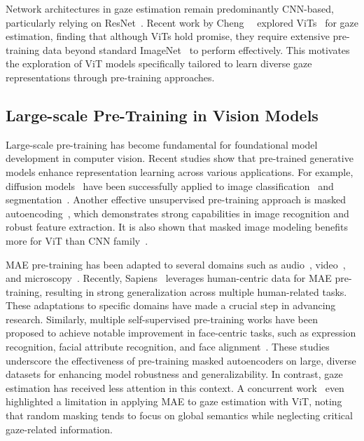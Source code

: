 Network architectures in gaze estimation remain predominantly CNN-based, particularly relying on ResNet~\cite{he2016deep}.
Recent work by Cheng~\etal~\cite{cheng2022gaze} explored ViTs~\cite{dosovitskiy2020vit} for gaze estimation, finding that although ViTs hold promise, they require extensive pre-training data beyond standard ImageNet~\cite{deng2009imagenet} to perform effectively.
This motivates the exploration of ViT models specifically tailored to learn diverse gaze representations through pre-training approaches.


\subsection{Large-scale Pre-Training in Vision Models}\label{sec:related_pretrain}
Large-scale pre-training has become fundamental for foundational model development in computer vision. 
Recent studies show that pre-trained generative models enhance representation learning across various applications. 
For example, diffusion models~\cite{ho2020denoising,rombach2022high} have been successfully applied to image classification~\cite{li2023your} and segmentation~\cite{li2023dreamteacher,xiang2023denoising,zhao2023unleashing}.
Another effective unsupervised pre-training approach is masked autoencoding~\cite{he2022masked,srivastava2024omnivec,singh2023effectiveness,fang2023eva}, which demonstrates strong capabilities in image recognition and robust feature extraction.
It is also shown that masked image modeling benefits more for ViT than CNN family~\cite{fang2022corrupted,kraus2024masked}.




MAE pre-training has been adapted to several domains such as audio~\cite{huang2022masked}, video~\cite{tong2022videomae}, and microscopy~\cite{kraus2024masked}.
Recently, Sapiens~\cite{khirodkar2025sapiens} leverages human-centric data for MAE pre-training, resulting in strong generalization across multiple human-related tasks.
These adaptations to specific domains have made a crucial step in advancing research.
Similarly, multiple self-supervised pre-training works have been proposed to achieve notable improvement in face-centric tasks, such as expression recognition, facial attribute recognition, and face alignment~\cite{zheng2022general,cai2023marlin,gao2024self,wang2023toward,sun2024face}.
These studies underscore the effectiveness of pre-training masked autoencoders on large, diverse datasets for enhancing model robustness and generalizability.
In contrast, gaze estimation has received less attention in this context.
A concurrent work~\cite{jiang2024learning} even highlighted a limitation in applying MAE to gaze estimation with ViT, noting that random masking tends to focus on global semantics while neglecting critical gaze-related information. 

